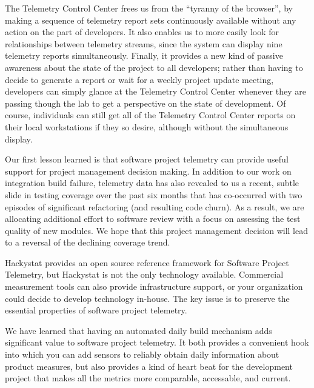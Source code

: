 \documentclass[11pt,twocolumn]{article}
\begin{document}
The Telemetry Control Center frees us from the ``tyranny of the browser'',
by making a sequence of telemetry report sets continuously available
without any action on the part of developers. It also enables us to more
easily look for relationships between telemetry streams, since the system
can display nine telemetry reports simultaneously.  Finally, it provides a
new kind of passive awareness about the state of the project to all
developers; rather than having to decide to generate a report or wait for a
weekly project update meeting, developers can simply glance at the
Telemetry Control Center whenever they are passing though the lab to get a
perspective on the state of development. Of course, individuals can still get all of the Telemetry Control Center reports 
on their local workstations if they so desire, although without the simultaneous display.


Our first lesson learned is that software project telemetry can provide
useful support for project management decision making. In addition to our
work on integration build failure, telemetry data has also revealed to us a
recent, subtle slide in testing coverage over the past six months that has
co-occurred with two episodes of significant refactoring (and resulting
code churn).  As a result, we are allocating additional effort to software
review with a focus on assessing the test quality of new modules.  We hope
that this project management decision will lead to a reversal of the
declining coverage trend.

Hackystat provides an open source reference framework for Software Project
Telemetry, but Hackystat is not the only technology available.  Commercial
measurement tools can also provide infrastructure support, or your
organization could decide to develop technology in-house. The key issue is
to preserve the essential properties of software project telemetry.

We have learned that having an automated daily build mechanism adds
significant value to software project telemetry. It both provides a
convenient hook into which you can add sensors to reliably obtain daily
information about product measures, but also provides a kind of heart beat
for the development project that makes all the metrics more comparable,
accessable, and current.
\end{document}
